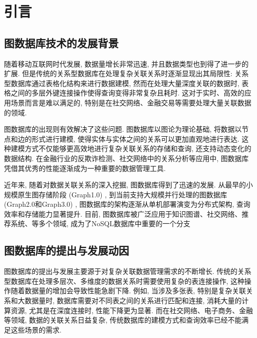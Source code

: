 \documentclass[12pt,hyperref,a4paper,UTF8]{ctexart}
\begin{document}
\cover
%
%

\thispagestyle{empty} %

\newpage
\tableofcontents

\newpage
\section{引言}

\subsection{图数据库技术的发展背景}

随着移动互联网时代发展, 数据量增长非常迅速, 并且数据类型也到得了进一步的扩展. 但是传统的关系型数据库在处理复杂关联关系时逐渐显现出其局限性: 关系型数据库通过表格化结构来进行数据建模, 然而在处理大量深度关联的数据时, 表格之间的多层外键连接操作使得查询变得非常复杂且耗时. 这对于实时、高效的应用场景而言是难以满足的, 特别是在社交网络、金融交易等需要处理大量关联数据的领域.

图数据库的出现则有效解决了这些问题. 图数据库以图论为理论基础, 将数据以节点和边的形式进行建模, 使得实体与实体之间的关系可以更加直观地进行表达. 这种建模方式不仅能够更高效地进行复杂关联关系的存储和查询, 还支持动态变化的数据结构. 在金融行业的反欺诈检测、社交网络中的关系分析等应用中, 图数据库凭借其优秀的性能逐渐成为一种重要的数据管理工具.

近年来, 随着对数据关联关系的深入挖掘, 图数据库得到了迅速的发展. 从最早的小规模原生图存储阶段 (Graph1.0) , 到当前支持大规模并行处理的图数据库 (Graph2.0和Graph3.0) , 图数据库的架构逐渐从单机部署演变为分布式架构, 查询效率和存储能力显著提升. 目前, 图数据库被广泛应用于知识图谱、社交网络、推荐系统、等多个领域, 成为了NoSQL数据库中重要的一个分支

\subsection{图数据库的提出与发展动因}

图数据库的提出与发展主要源于对复杂关联数据管理需求的不断增长. 传统的关系型数据库在处理多层次、多维度的数据关系时需要使用复杂的表连接操作, 这种操作随着数据量的增加会导致性能急剧下降. 例如, 当涉及多张表, 特别是复杂关联关系和大数据量时, 数据库需要对不同表之间的关系进行匹配和连接, 消耗大量的计算资源, 尤其是在深度连接时, 性能下降更为显著. 而在社交网络、电子商务、金融等领域, 数据的关联关系日益复杂, 传统数据库的建模方式和查询效率已经不能满足这些场景的需求.
\end{document}
